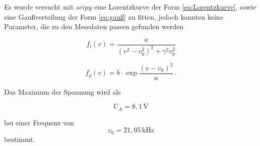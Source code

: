 Es wurde versucht mit $ scipy$ eine Lorentzkurve der Form \eqref{eq:Lorentzkurve}, sowie eine Gaußverteilung der Form \eqref{eq:gauß} zu fitten, jedoch konnten keine Parameter, die zu den Messdaten passen gefunden werden

\begin{equation}
    f_l(v) = \frac{a}{(v^2-v_0^2)^2 + {\gamma}^2 v_0^2}
    \label{eq:Lorentzkurve}
\end{equation}

\begin{equation}
    f_g(v) = b \cdot \exp{\frac{(v-v_0)^2}{a}} \,.
    \label{eq:gauß}
\end{equation} 

Das Maximum der Spannung wird als

\begin{equation}
    U_A = 8,1 \, \unit{\volt}
\end{equation}

bei einer Frequenz von 
\begin{equation}
    v_0 = 21,05 \, \unit{\kilo\hertz}
\end{equation}
bestimmt.